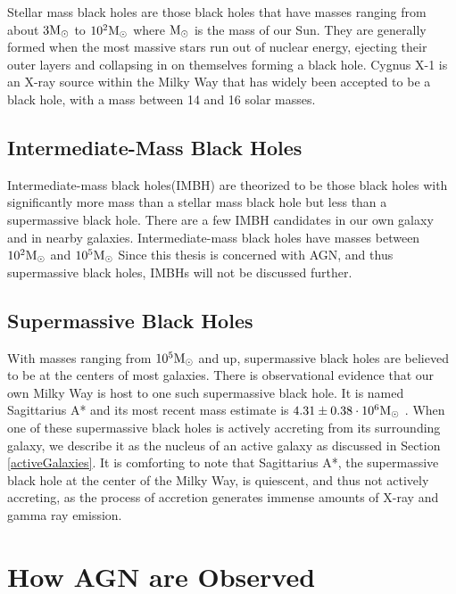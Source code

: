 \documentclass[12pt, oneside]{smuthesis}
\begin{document}
Stellar mass black holes are those black holes that have masses ranging from about $3\textup{M}_{\odot}$ to $10^{2}\textup{M}_{\odot}$ where $\textup{M}_{\odot}$ is the mass of our Sun. They are generally formed when the most massive stars run out of nuclear energy, ejecting their outer layers and collapsing in on themselves forming a black hole. Cygnus X-1 is an X-ray source within the Milky Way that has widely been accepted to be a black hole, with a mass between 14 and 16 solar masses.

\subsection{\sc Intermediate-Mass Black Holes} \label{intermediateBH}

Intermediate-mass black holes(IMBH) are theorized to be those black holes with significantly more mass than a stellar mass black hole but less than a supermassive black hole. There are a few IMBH candidates in our own galaxy and in nearby galaxies. Intermediate-mass black holes have masses between $10^{2}\textup{M}_{\odot}$ and $10^{5}\textup{M}_{\odot}$ Since this thesis is concerned with AGN, and thus supermassive black holes, IMBHs will not be discussed further.

\subsection{\sc Supermassive Black Holes}

With masses ranging from $10^{5}\textup{M}_{\odot}$ and up, supermassive black holes are believed to be at the centers of most galaxies. There is observational evidence that our own Milky Way is host to one such supermassive black hole. It is named Sagittarius A* and its most recent mass estimate is $4.31\pm 0.38\cdot 10^{6}\textup{M}_{\odot}$ \citep{gillessen2009}. When one of these supermassive black holes is actively accreting from its surrounding galaxy, we describe it as the nucleus of an active galaxy as discussed in Section \ref{activeGalaxies}. It is comforting to note that Sagittarius A*, the supermassive black hole at the center of the Milky Way, is quiescent, and thus not actively accreting, as the process of accretion generates immense amounts of X-ray and gamma ray emission.

\section{\sc How AGN are Observed} \label{howObserved}
\end{document}
